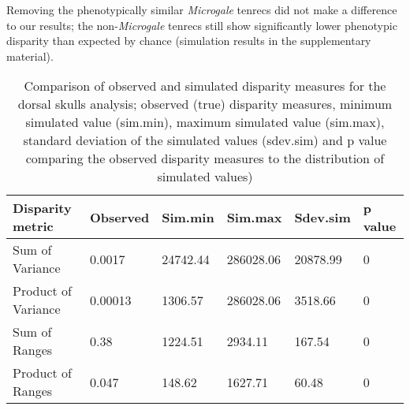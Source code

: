 \documentclass[12pt,a4paper]{article}
\begin{document}
Removing the phenotypically similar \textit{Microgale} tenrecs did not make a difference to our results; the non-\textit{Microgale} tenrecs still show significantly lower phenotypic disparity than expected by chance (simulation results in the supplementary material). 



\begin{table}[H]				%

\centering
\caption{Comparison of observed and simulated disparity measures for the dorsal skulls analysis; observed (true) disparity measures, minimum simulated value (sim.min), maximum simulated value (sim.max), standard deviation of the simulated values (sdev.sim) and p value comparing the observed disparity measures to the distribution of simulated values)}

\begin{tabular}[t]{l l l l l l }		%
\hline
\textbf{Disparity metric} & \textbf{Observed} & \textbf{Sim.min} & \textbf{Sim.max} & \textbf{Sdev.sim} & \textbf{p value} \\
\hline
Sum of Variance & 0.0017 & 24742.44 & 286028.06 & 20878.99 &	0\\
Product of Variance	& 0.00013 &	1306.57 &	286028.06 &	3518.66 & 0\\
Sum of Ranges &	0.38 &	1224.51 &	2934.11 &	167.54 & 0 \\
Product of Ranges & 0.047 &	148.62 & 1627.71 &	60.48 &	0\\
\hline
\end{tabular}
\label{skdorssims} %
\end{table}
\end{document}

